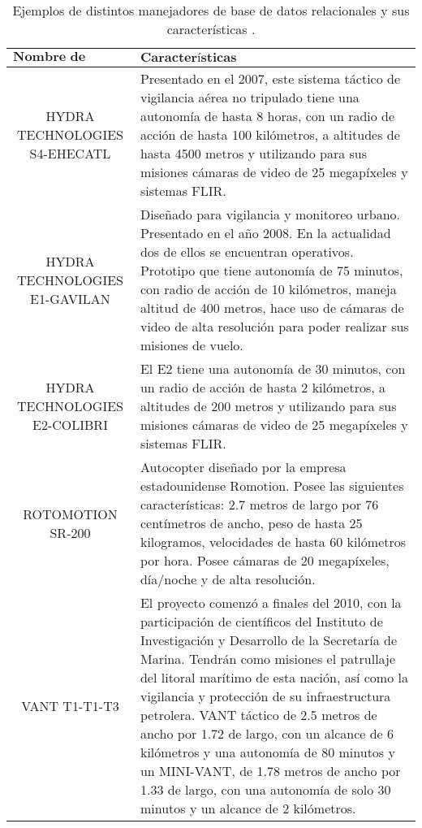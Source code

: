 \begin{table}[H]
	\centering 
	\caption{Ejemplos de distintos manejadores de base de datos
		relacionales y sus características \cite{vehiculos_aereos_lat}.}
	\begin{tabular*}{0.93\textwidth}{@{\extracolsep{\fill}} |c|l|}
		\hline
		$\textbf{Nombre de Proyecto}$ & $\textbf{Características}$ \\
		\hline \hline
		\parbox[t]{3.1cm}{HYDRA TECHNOLOGIES S4-EHECATL} & 
		\parbox[t]{10.2cm}{Presentado en el 2007, este sistema táctico de 
		vigilancia aérea no tripulado tiene una autonomía de hasta 8 
		horas, con un radio de acción de hasta 100 kilómetros, a 
		altitudes de hasta 4500 metros y utilizando para sus misiones 
		cámaras de video de 25 megapíxeles y sistemas FLIR.
		} \\\hline
		\parbox[t]{3.1cm}{HYDRA TECHNOLOGIES E1-GAVILAN} & 
		\parbox[t]{10.2cm}{
		Diseñado para vigilancia y monitoreo urbano. Presentado en el 
		año 2008. En la actualidad dos de ellos se encuentran 
		operativos. Prototipo que tiene autonomía de 75 minutos, con 
		radio de acción de 10 kilómetros, maneja altitud de 400 metros, 
		hace uso de cámaras de video de alta resolución para poder 
		realizar sus misiones de vuelo.
		} \\\hline
		\parbox[t]{3.1cm}{HYDRA TECHNOLOGIES E2-COLIBRI} & 
		\parbox[t]{10.2cm}{
		El E2 tiene una autonomía de 30 minutos, con un radio de acción 
		de hasta 2 kilómetros, a altitudes de 200 metros y utilizando 
		para sus misiones cámaras de video de 25 megapíxeles y sistemas 
		FLIR.
		} \\\hline
		\parbox[t]{3.1cm}{ROTOMOTION SR-200} & 
		\parbox[t]{10.2cm}{
		Autocopter diseñado por la empresa estadounidense Romotion. 
		Posee las siguientes características: 2.7 metros de largo por 76 
		centímetros de ancho, peso de hasta 25 kilogramos, velocidades 
		de hasta 60 kilómetros por hora. Posee cámaras de 20 
		megapíxeles, día/noche y de alta resolución.
		}
		\\\hline
		\parbox[t]{3.1cm}{VANT T1-T1-T3} & 
		\parbox[t]{10.2cm}{El proyecto comenzó a finales del 2010, con 
		la participación de científicos del Instituto de Investigación y 
		Desarrollo de la Secretaría de Marina. Tendrán como misiones el 
		patrullaje del litoral marítimo de esta nación, así como la 
		vigilancia y protección de su infraestructura petrolera. VANT 
		táctico de 2.5 metros de ancho por 1.72 de largo, con un alcance 
		de 6 kilómetros y una autonomía de 80 minutos y un MINI-VANT, de 
		1.78 metros de ancho por 1.33 de largo, con una autonomía de solo 
		30 minutos y un alcance de 2 kilómetros.
		}
		\\\hline
	\end{tabular*}
\end{table}

